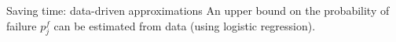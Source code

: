\documentclass[slides]{beamer}
\begin{document}
\begin{frame}{Saving time: data-driven approximations}
    An upper bound on the probability of failure $p^f_j$ can be estimated from
    data (using logistic regression).

    
%
\end{frame}
\end{document}
